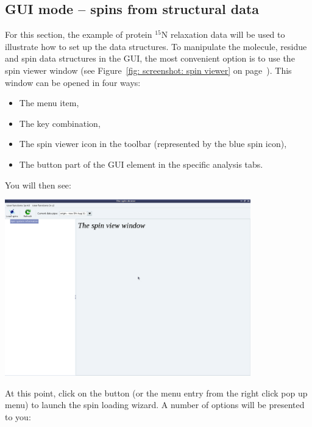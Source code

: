 
\subsection{GUI mode -- spins from structural data} \label{sect: GUI - structural data}

For this section, the example of protein $^{15}$N relaxation data will be used to illustrate how to set up the data structures.  To manipulate the molecule, residue and spin data structures in the GUI, the most convenient option is to use the spin viewer window (see Figure~\ref{fig: screenshot: spin viewer} on page~\pageref{fig: screenshot: spin viewer}).  This window can be opened in four ways:

\begin{itemize}
\item The  menu item,
\item The  key combination,
\item The spin viewer icon in the toolbar (represented by the blue spin icon),
\item The  button part of the  GUI element in the specific analysis tabs.
\end{itemize}

You will then see:

\begin{minipage}[h]{\linewidth}
\centerline{\includegraphics[width=0.8\textwidth, bb=14 14 1415 1019]{graphics/screenshots/spin_viewer/blank}}
\label{figure: spin viewer blank}
\end{minipage}

At this point, click on the  button (or the  menu entry from the right click pop up menu) to launch the spin loading wizard.  A number of options will be presented to you: 


